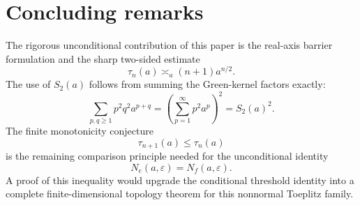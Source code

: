 \documentclass[11pt]{amsart}
\numberwithin{equation}{section}
\newcommand{\eps}{\varepsilon}
\begin{document}
\section{Concluding remarks}

The rigorous unconditional contribution of this paper is the real-axis barrier formulation and the sharp two-sided estimate
\[
\tau_n(a)\asymp_a (n+1)a^{n/2}.
\]
The use of \(S_2(a)\) follows from summing the Green-kernel factors exactly:
\[
\sum_{p,q\ge1}p^2q^2a^{p+q}
=
\left(\sum_{p=1}^{\infty}p^2a^p\right)^2
=
S_2(a)^2.
\]
The finite monotonicity conjecture
\[
\tau_{n+1}(a)\le\tau_n(a)
\]
is the remaining comparison principle needed for the unconditional identity
\[
N_e(a,\eps)=N_f(a,\eps).
\]
A proof of this inequality would upgrade the conditional threshold identity into a complete finite-dimensional topology theorem for this nonnormal Toeplitz family.
\end{document}
